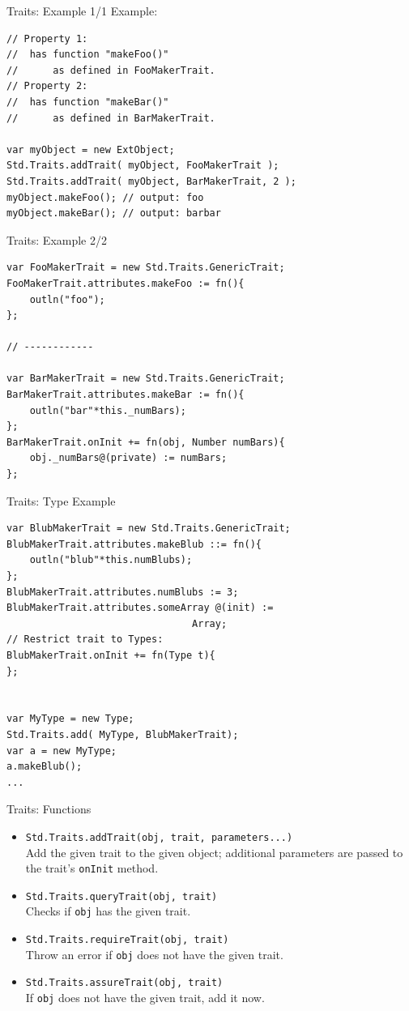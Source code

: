 \documentclass[ucs,9pt]{beamer}
\begin{document}
\begin{frame}[fragile]{Traits: Example 1/1}
Example: 
\begin{lstlisting}
// Property 1: 
//	has function "makeFoo()" 
//		as defined in FooMakerTrait.
// Property 2: 
//	has function "makeBar()" 
//		as defined in BarMakerTrait.

var myObject = new ExtObject;
Std.Traits.addTrait( myObject, FooMakerTrait );
Std.Traits.addTrait( myObject, BarMakerTrait, 2 );
myObject.makeFoo(); // output: foo
myObject.makeBar(); // output: barbar
\end{lstlisting}
\end{frame}

\begin{frame}[fragile]{Traits: Example 2/2}
\begin{lstlisting}
var FooMakerTrait = new Std.Traits.GenericTrait;
FooMakerTrait.attributes.makeFoo := fn(){ 
	outln("foo"); 
};

// ------------

var BarMakerTrait = new Std.Traits.GenericTrait;
BarMakerTrait.attributes.makeBar := fn(){ 
	outln("bar"*this._numBars); 
};
BarMakerTrait.onInit += fn(obj, Number numBars){
	obj._numBars@(private) := numBars;
};
\end{lstlisting}
\end{frame}


\begin{frame}[fragile]{Traits: Type Example}
\begin{lstlisting}
var BlubMakerTrait = new Std.Traits.GenericTrait;
BlubMakerTrait.attributes.makeBlub ::= fn(){ 
	outln("blub"*this.numBlubs); 
};
BlubMakerTrait.attributes.numBlubs := 3;
BlubMakerTrait.attributes.someArray @(init) := 
								Array;
// Restrict trait to Types:
BlubMakerTrait.onInit += fn(Type t){
}; 


var MyType = new Type;
Std.Traits.add( MyType, BlubMakerTrait);
var a = new MyType;
a.makeBlub();
...

\end{lstlisting}
\end{frame}
%

\begin{frame}[fragile]{Traits: Functions}
\begin{itemize}
\item \lstinline!Std.Traits.addTrait(obj, trait, parameters...)! \\
	Add the given trait to the given object; additional parameters are passed to the trait's \lstinline!onInit! method.
\item \lstinline!Std.Traits.queryTrait(obj, trait)! \\
	Checks if \lstinline!obj! has the given trait.
\item \lstinline!Std.Traits.requireTrait(obj, trait)! \\
	Throw an error if \lstinline!obj! does not have the given trait.
\item \lstinline!Std.Traits.assureTrait(obj, trait)! \\
	If \lstinline!obj! does not have the given trait, add it now.
\end{itemize}
\end{frame}
%
\end{document}

